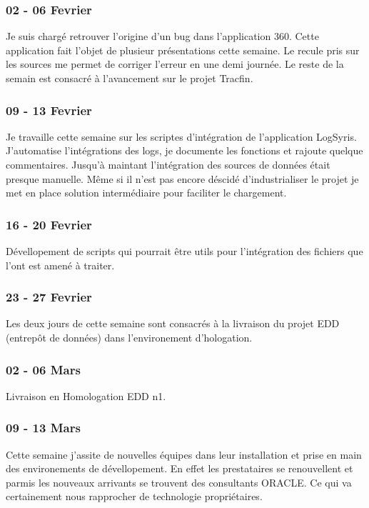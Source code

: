 \subsubsection*{02 - 06 Fevrier}
Je suis chargé retrouver l'origine d'un bug dans l'application 360. Cette application fait l'objet de plusieur présentations cette semaine. Le recule pris sur les sources me permet de corriger l'erreur en une demi journée. Le reste de la semain est consacré à l'avancement sur le projet Tracfin.

\subsubsection*{09 - 13 Fevrier}
Je travaille cette semaine sur les scriptes d'intégration de l'application LogSyris. J'automatise l'intégrations des logs, je documente les fonctions et rajoute quelque commentaires. Jusqu'à maintant l'intégration des sources de données était presque manuelle. Même si il n'est pas encore déscidé d'industrialiser le projet je met en place solution intermédiaire pour faciliter le chargement. 

\subsubsection*{16 - 20 Fevrier}
Dévellopement de scripts qui pourrait être utils pour l'intégration des fichiers que l'ont est amené à traiter.

\subsubsection*{23 - 27 Fevrier}
Les deux jours de cette semaine sont consacrés à la livraison du projet EDD (entrepôt de données) dans l'environement d'hologation.

\subsubsection*{02 - 06 Mars}
Livraison en Homologation EDD n1.

\subsubsection*{09 - 13 Mars}
Cette semaine j'assite de nouvelles équipes dans leur installation et prise en main des environements de dévellopement. En effet les prestataires se renouvellent et parmis les nouveaux arrivants se trouvent des consultants ORACLE. Ce qui va certainement nous rapprocher de technologie propriétaires.

